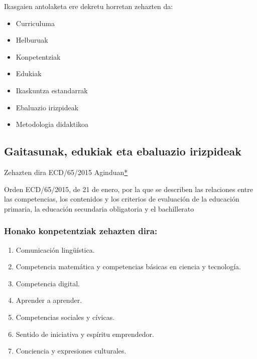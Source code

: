 \documentclass[
]{book}
\providecommand{\tightlist}{%
  \setlength{\itemsep}{0pt}\setlength{\parskip}{0pt}}
\begin{document}
Ikasgaien antolaketa ere dekretu horretan zehazten da:

\begin{itemize}
\tightlist
\item
  Curriculuma
\item
  Helburuak
\item
  Konpetentziak
\item
  Edukiak
\item
  Ikaskuntza estandarrak
\item
  Ebaluazio irizpideak
\item
  Metodologia didaktikoa
\end{itemize}

\hypertarget{gaitasunak-edukiak-eta-ebaluazio-irizpideak}{%
\subsection{Gaitasunak, edukiak eta ebaluazio irizpideak}\label{gaitasunak-edukiak-eta-ebaluazio-irizpideak}}

Zehazten dira ECD/65/2015 Aginduan\href{https://www.boe.es/buscar/doc.php?id=BOE-A-2015-738}{*}

Orden ECD/65/2015, de 21 de enero, por la que se describen las relaciones entre las competencias, los contenidos y los criterios de evaluación de la educación primaria, la educación secundaria obligatoria y el bachillerato

\hypertarget{honako-konpetentziak-zehazten-dira}{%
\subsubsection{Honako konpetentziak zehazten dira:}\label{honako-konpetentziak-zehazten-dira}}

\begin{enumerate}
\def\labelenumi{\arabic{enumi}.}
\tightlist
\item
  Comunicación lingüística.
\item
  Competencia matemática y competencias básicas en ciencia y tecnología.
\item
  Competencia digital.
\item
  Aprender a aprender.
\item
  Competencias sociales y cívicas.
\item
  Sentido de iniciativa y espíritu emprendedor.
\item
  Conciencia y expresiones culturales.
\end{enumerate}
\end{document}
